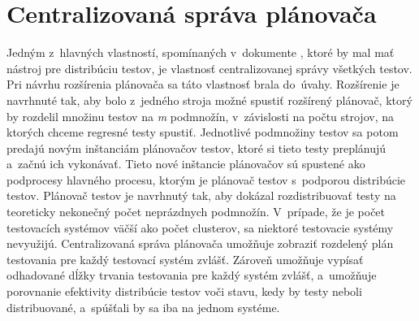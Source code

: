 \section{Centralizovaná správa plánovača}
\label{sekcia:centralizovana_sprava}
Jedným z~hlavných vlastností, spomínaných v~dokumente 
\cite{Parallel_approach},  ktoré by mal mať nástroj pre distribúciu 
testov, je vlastnosť  centralizovanej správy všetkých testov. 
Pri návrhu rozšírenia plánovača sa táto vlastnosť brala do~úvahy. 
Rozšírenie je navrhnuté tak, aby bolo z~jedného stroja možné spustiť 
rozšírený plánovač, ktorý by rozdelil množinu 
testov na \emph{m} podmnožín, v~závislosti na počtu strojov, na ktorých 
chceme regresné testy spustiť. Jednotlivé podmnožiny testov sa 
potom predajú novým inštanciám plánovačov testov, ktoré si tieto testy 
preplánujú a~začnú ich vykonávať. 
Tieto nové inštancie plánovačov sú spustené ako podprocesy hlavného procesu, 
ktorým je plánovač testov s~podporou distribúcie testov.
Plánovač testov je navrhnutý tak, aby dokázal rozdistribuovať testy na 
teoreticky nekonečný počet neprázdnych podmnožín.
V~prípade, že je počet testovacích systémov väčší ako počet clusterov, 
sa niektoré testovacie systémy nevyužijú.
Centralizovaná správa plánovača umožňuje zobraziť rozdelený plán 
testovania pre každý testovací systém zvlášť. Zároveň umožňuje vypísať 
odhadované dĺžky trvania testovania pre každý systém zvlášť, a~umožňuje porovnanie 
efektivity distribúcie testov voči stavu, kedy by testy neboli 
distribuované, a~spúšťali by sa iba na jednom systéme. 

